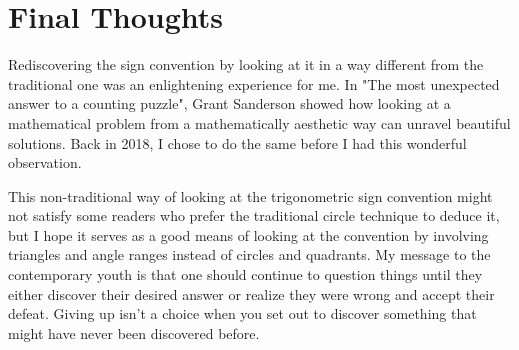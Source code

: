 \documentclass{article}
\begin{document}
\section{Final Thoughts}

Rediscovering the sign convention by looking at it in a way different from the traditional one was an enlightening experience for me. In "The most unexpected answer to a counting puzzle", Grant Sanderson showed how looking at a mathematical problem from a mathematically aesthetic way can unravel beautiful solutions.\autocite{YouTube:1} Back in 2018, I chose to do the same before I had this wonderful observation.

This non-traditional way of looking at the trigonometric sign convention might not satisfy some readers who prefer the traditional circle technique to deduce it, but I hope it serves as a good means of looking at the convention by involving triangles and angle ranges instead of circles and quadrants. My message to the contemporary youth is that one should continue to question things until they either discover their desired answer or realize they were wrong and accept their defeat. Giving up isn't a choice when you set out to discover something that might have never been discovered before.

\newpage
\printbibliography
\end{document}
